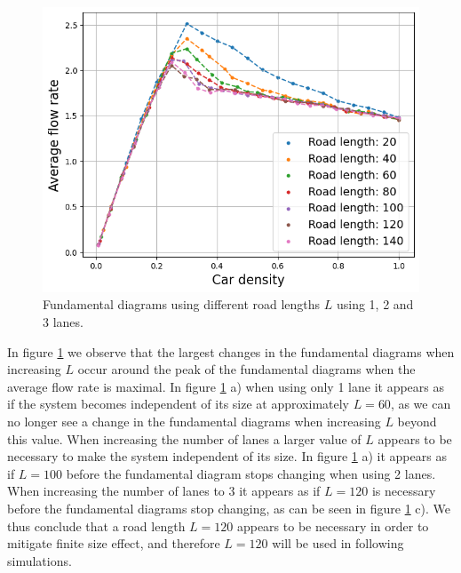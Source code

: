 \documentclass[a4paper,12pt]{article}
\begin{document}
\begin{figure}[H]
\begin{minipage}{.5\textwidth}
        \includegraphics[scale=0.47]{Images/fundamental diagrams 3 lanes 140.png}
    \end{minipage}%
    \caption{Fundamental diagrams using different road lengths $L$ using 1, 2 and 3 lanes.}
    \label{finite size effects}
\end{figure}

In figure \ref*{finite size effects} we observe that the largest changes in the fundamental diagrams when increasing $L$ occur around the
peak of the fundamental diagrams when the average flow rate is maximal. In figure \ref*{finite size effects} a) when using only 1 lane it appears
as if the system becomes independent of its size at approximately $L=60$, as we can no longer see a change in the fundamental diagrams when increasing
$L$ beyond this value. When increasing the number of lanes a larger value of $L$ appears to be necessary to make the system independent of its size. 
In figure \ref*{finite size effects} a) it appears as if $L=100$ before the fundamental diagram stops changing when using 2 lanes. When increasing the number
of lanes to 3 it appears as if $L=120$ is necessary before the fundamental diagrams stop changing, as can be seen in figure \ref*{finite size effects} c).
We thus conclude that a road length $L=120$ appears to be necessary in order to mitigate finite size effect, and therefore $L=120$ will be used
in following simulations.
\end{document}
